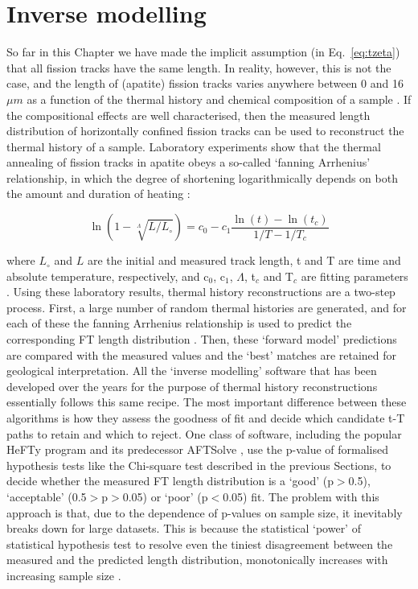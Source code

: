 \documentclass{article}
\begin{document}
\section{Inverse modelling}
\label{sec:modelling}

So far in this Chapter we have made the implicit assumption (in
Eq.~\ref{eq:tzeta}) that all fission tracks have the same
length. In reality, however, this is not the case, and the length of
(apatite) fission tracks varies anywhere between 0 and 16$\mu m$ as a
function of the thermal history and chemical composition of a sample
\citep{gleadow1986}. If the compositional effects \citep[notably the
  Cl/F ratio,][]{green1986} are well characterised, then the measured
length distribution of horizontally confined fission tracks can be
used to reconstruct the thermal history of a sample. Laboratory
experiments show that the thermal annealing of fission tracks in
apatite obeys a so-called `fanning Arrhenius' relationship, in which
the degree of shortening logarithmically depends on both the amount
and duration of heating \citep{green1985, laslett1987, laslett1996,
  ketcham1999, ketcham2007}:

\begin{equation}
\ln \left(1 - \sqrt[\Lambda]{L/L_\circ}\right) = 
c_0 - c_1 \frac{\ln (t) - \ln (t_c)}{1/T - 1/T_c}
\end{equation}

where $L_\circ$ and $L$ are the initial and measured track length, t
and T are time and absolute temperature, respectively, and c$_0$,
c$_1$, $\Lambda$, t$_c$ and T$_c$ are fitting parameters
\citep{laslett1996, ketcham1999}. Using these laboratory results,
thermal history reconstructions are a two-step process. First, a large
number of random thermal histories are generated, and for each of
these the fanning Arrhenius relationship is used to predict the
corresponding FT length distribution \citep{corrigan1991, lutz1991,
  gallagher1995, willett1997, ketcham2000, ketcham2005,
  gallagher2012}. Then, these `forward model' predictions are compared
with the measured values and the `best' matches are retained for
geological interpretation. All the `inverse modelling' software that
has been developed over the years for the purpose of thermal history
reconstructions essentially follows this same recipe. The most
important difference between these algorithms is how they assess the
goodness of fit and decide which candidate t-T paths to retain and
which to reject.  One class of software, including the popular HeFTy
program and its predecessor AFTSolve \citep{ketcham2000,ketcham2005},
use the p-value of formalised hypothesis tests like the Chi-square
test described in the previous Sections, to decide whether the
measured FT length distribution is a `good' (p$>$0.5), `acceptable'
(0.5$>$p$>$0.05) or `poor' (p$<$0.05) fit. The problem with this
approach is that, due to the dependence of p-values on sample size, it
inevitably breaks down for large datasets. This is because the
statistical `power' of statistical hypothesis test to resolve even the
tiniest disagreement between the measured and the predicted length
distribution, monotonically increases with increasing sample size
\citep{vermeesch2014}.\\
\end{document}

